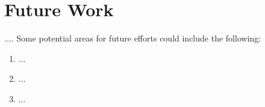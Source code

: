 \section{Future Work}
.... Some potential areas for future efforts could include the following:

\begin{enumerate}
      \item ...
      \item ...
      \item ...

\end{enumerate}

\vfill \strut  %
\cleardoublepage